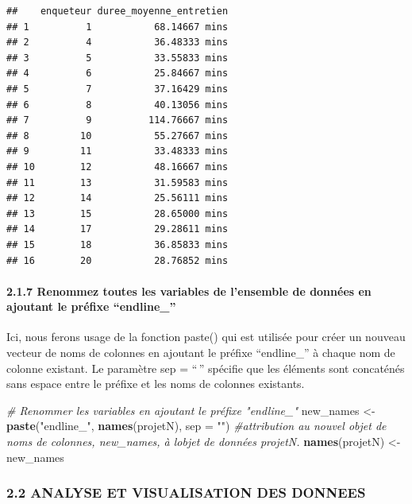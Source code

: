 \documentclass[
]{article}
\newenvironment{Shaded}{\begin{snugshade}}{\end{snugshade}}
\newcommand{\AttributeTok}[1]{\textcolor[rgb]{0.13,0.29,0.53}{#1}}
\newcommand{\CommentTok}[1]{\textcolor[rgb]{0.56,0.35,0.01}{\textit{#1}}}
\newcommand{\FunctionTok}[1]{\textcolor[rgb]{0.13,0.29,0.53}{\textbf{#1}}}
\newcommand{\NormalTok}[1]{#1}
\newcommand{\OtherTok}[1]{\textcolor[rgb]{0.56,0.35,0.01}{#1}}
\newcommand{\StringTok}[1]{\textcolor[rgb]{0.31,0.60,0.02}{#1}}
\begin{document}
\begin{verbatim}
##    enqueteur duree_moyenne_entretien
## 1          1           68.14667 mins
## 2          4           36.48333 mins
## 3          5           33.55833 mins
## 4          6           25.84667 mins
## 5          7           37.16429 mins
## 6          8           40.13056 mins
## 7          9          114.76667 mins
## 8         10           55.27667 mins
## 9         11           33.48333 mins
## 10        12           48.16667 mins
## 11        13           31.59583 mins
## 12        14           25.56111 mins
## 13        15           28.65000 mins
## 14        17           29.28611 mins
## 15        18           36.85833 mins
## 16        20           28.76852 mins
\end{verbatim}

\hypertarget{renommez-toutes-les-variables-de-lensemble-de-donnuxe9es-en-ajoutant-le-pruxe9fixe-endline_}{%
\paragraph{2.1.7 Renommez toutes les variables de l'ensemble de données
en ajoutant le préfixe
``endline\_''}\label{renommez-toutes-les-variables-de-lensemble-de-donnuxe9es-en-ajoutant-le-pruxe9fixe-endline_}}

Ici, nous ferons usage de la fonction paste() qui est utilisée pour
créer un nouveau vecteur de noms de colonnes en ajoutant le préfixe
``endline\_'' à chaque nom de colonne existant. Le paramètre sep =
``\,'' spécifie que les éléments sont concaténés sans espace entre le
préfixe et les noms de colonnes existants.

\begin{Shaded}
\begin{Highlighting}[]
\CommentTok{\# Renommer les variables en ajoutant le préfixe "endline\_"}
\NormalTok{new\_names }\OtherTok{\textless{}{-}} \FunctionTok{paste}\NormalTok{(}\StringTok{"endline\_"}\NormalTok{, }\FunctionTok{names}\NormalTok{(projetN), }\AttributeTok{sep =} \StringTok{""}\NormalTok{)}
\CommentTok{\#attribution au nouvel objet de noms de colonnes, new\_names, à l\textquotesingle{}objet de données projetN.}
\FunctionTok{names}\NormalTok{(projetN) }\OtherTok{\textless{}{-}}\NormalTok{ new\_names}
\end{Highlighting}
\end{Shaded}

\hypertarget{analyse-et-visualisation-des-donnees}{%
\subsubsection{2.2 ANALYSE ET VISUALISATION DES
DONNEES}\label{analyse-et-visualisation-des-donnees}}
\end{document}
